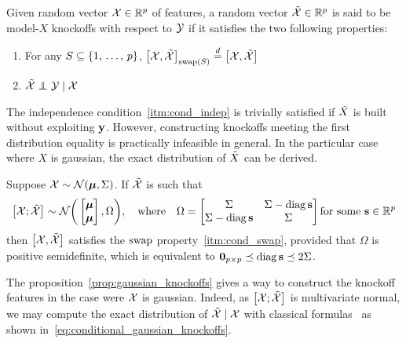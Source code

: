 \begin{definition}
Given random vector $\mathcal{X} \in \mathbb{R}^p$ of features,
a random vector $\tilde{\mathcal{X}} \in \mathbb{R}^p$ is said to be model-$X$ knockoffs with respect to $\mathcal{Y}$
if it satisfies the two following properties:
\begin{enumerate}[label=\textbf{S.\arabic*},ref=S.\arabic*]
        \item \label{itm:cond_swap} For any $S \subseteq \left\{ 1,\, \dots,\, p \right\}$,
                $\big[ \mathcal{X}, \tilde{\mathcal{X}} \big]_{\operatorname{swap}(S)} \stackrel{d}{=} \big[ \mathcal{X}, \tilde{\mathcal{X}} \big]$
        \item \label{itm:cond_indep} $\tcX \independent \cY \mid \cX$
\end{enumerate}
\end{definition}
The independence condition~\ref{itm:cond_indep} is trivially satisfied if $\tilde{X}$ is built without exploiting $\mathbf{y}$.
However, constructing knockoffs meeting the first distribution equality is practically infeasible in general.
In the particular case where $X$ is gaussian, the exact distribution of $\tilde{X}$ can be derived.
\begin{proposition}
        Suppose $\mathcal{X} \sim \mathcal{N}(\bm{\mu}, \Sigma)$.
        If $\tilde{\mathcal{X}}$ is such that
        \begin{equation*}
                \big[ \mathcal{X}; \tilde{\mathcal{X}} \big] \sim \mathcal{N}\bigg(\begin{bmatrix} \bm{\mu}\\ \bm{\mu} \end{bmatrix}, \Omega\bigg)
                ,\quad\text{where}\quad
                \Omega = \begin{bmatrix}
                         \Sigma & \Sigma - \operatorname*{diag} \mathbf{s}\\
                         \Sigma - \operatorname*{diag} \mathbf{s} & \Sigma
                \end{bmatrix}
                \text{for some }
                \mathbf{s} \in \mathbb{R}^p
        \end{equation*}
        then $\big[\mathcal{X}, \tilde{\mathcal{X}} \big]$ satisfies the $\operatorname{swap}$ property~\ref{itm:cond_swap},
        provided that $\Omega$ is positive semidefinite,
        which is equivalent to $\mathbf{0}_{p \times p} \preceq \operatorname*{diag} \mathbf{s} \preceq 2\Sigma$.
\end{proposition}\label{prop:gaussian_knockoffs}
The proposition~\ref{prop:gaussian_knockoffs} gives a way to construct the knockoff features in the case were
$\mathcal{X}$ is gaussian.
Indeed, as $\big[ \mathcal{X}; \tilde{\mathcal{X}} \big]$ is multivariate normal, we may compute the exact distribution of
$\tilde{\mathcal{X}} \mid \mathcal{X}$ with classical formulas~\cite{conditional_normal} as shown in~\ref{eq:conditional_gaussian_knockoffs}.
